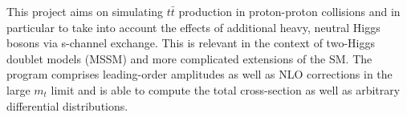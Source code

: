 This project aims on simulating $ t\bar{t} $ production in proton-\/proton collisions and in particular to take into account the effects of additional heavy, neutral Higgs bosons via s-\/channel exchange. This is relevant in the context of two-\/\-Higgs doublet models (M\-S\-S\-M) and more complicated extensions of the S\-M. The program comprises leading-\/order amplitudes as well as N\-L\-O corrections in the large $ m_t $ limit and is able to compute the total cross-\/section as well as arbitrary differential distributions. 